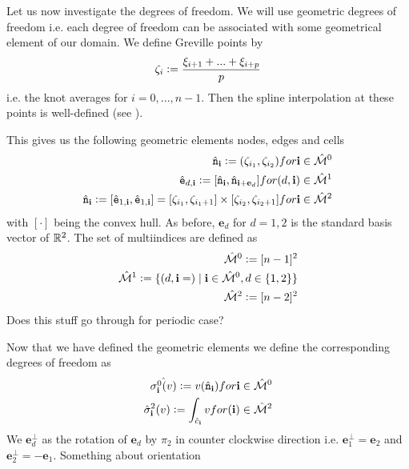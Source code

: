 \documentclass[../master_thesis.tex]{subfiles}
\begin{document}
Let us now investigate the degrees of freedom. We will use geometric degrees of 
freedom i.e. each degree of freedom can be associated with some geometrical element of our 
domain. We define Greville points by 
\begin{align*}
    \zeta_i \vcentcolon= \frac{\xi_{i+1} + ... + \xi_{i+p}}{p}
\end{align*}
i.e. the knot averages for $i=0,...,n-1$. Then the spline interpolation at these 
points is well-defined (see \cite{I think that was in the isogeometric analysis book}).

This gives us the following geometric elements nodes, edges and cells
\begin{align*}
    \hat{\mathtt{n}}_\mathbf{i} \vcentcolon= (\zeta_{i_1}, \zeta_{i_2}) for \mathbf{i} \in \hat{\mathcal{M}}^0
    \\ \hat{\mathtt{e}}_{d,\mathbf{i}} 
        \vcentcolon= [\hat{\mathtt{n}}_\mathbf{i}, \hat{\mathtt{n}}_{\mathbf{i} + \mathbf{e}_d}] 
        for (d, \mathbf{i}) \in \hat{\mathcal{M}}^1
    \\ \hat{\mathtt{n}}_\mathbf{i} \vcentcolon= [\hat{\mathtt{e}}_{1,\mathbf{i}}, \hat{\mathtt{e}}_{1,\mathbf{i}}]
        = [\zeta_{i_1}, \zeta_{i_1+1}] \times [\zeta_{i_2}, \zeta_{i_2+1}] 
        for \mathbf{i} \in \hat{\mathcal{M}}^2 
\end{align*}
with $[\cdot]$ being the convex hull. As before, $\mathbf{e}_d$ for $d = 1,2$ is the 
standard basis vector of $\mathbb{R}^2$. The set of multiindices are defined as
\begin{align*}
    \hat{\mathcal{M}}^0 \vcentcolon= [n-1]^2
    \\ \hat{\mathcal{M}}^1 \vcentcolon= \{ (d, \mathbf{i}=) \mid \mathbf{i} \in \hat{\mathcal{M}}^0, d\in \{1,2\} \}
    \\ \hat{\mathcal{M}}^2 \vcentcolon= [n-2]^2
\end{align*}
{\color{red} Does this stuff go through for periodic case?}

Now that we have defined the geometric elements we define the corresponding 
degrees of freedom as 
\begin{align*}
    \hat{\sigma_\mathbf{i}^0(v) } \vcentcolon= v(\hat{\mathtt{n}}_\mathbf{i}) for \mathbf{i} \in \hat{\mathcal{M}}^0
    \\ \hat{\sigma}_{\mathbf{i}}^2(v) 
        \vcentcolon= \int_{\hat{c}_{\mathbf{i}}} v 
        for (\mathbf{i}) \in \hat{\mathcal{M}}^2
\end{align*}
We $\mathbf{e}_d^\perp$ as the rotation of $\mathbf{e}_d$ by $\pi_2$ in counter clockwise 
direction i.e. $\mathbf{e}^\perp_1= \mathbf{e}_2$ and $\mathbf{e}^\perp_2= -\mathbf{e}_1$.  
Something about orientation
\end{document}
